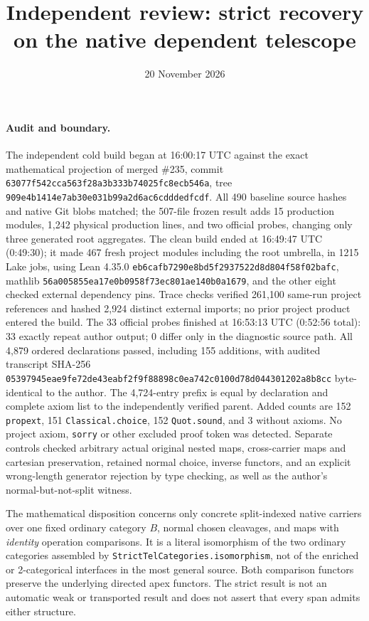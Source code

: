 \documentclass[11pt]{article}
\title{Independent review: strict recovery on the native dependent telescope}
\author{}
\date{20 November 2026}
\newcommand{\code}[1]{\texttt{#1}}
\begin{document}
\maketitle

\paragraph{Audit and boundary.}
The independent cold build began at 16:00:17 UTC against the exact mathematical projection of merged \#235, commit \code{63077f542cca563f28a3b333b74025fc8ecb546a}, tree \code{909e4b1414e7ab30e031b99a2d6ac6cdddedfcdf}. All 490 baseline source hashes and native Git blobs matched; the 507-file frozen result adds 15 production modules, 1,242 physical production lines, and two official probes, changing only three generated root aggregates. The clean build ended at 16:49:47 UTC (0:49:30); it made 467 fresh project modules including the root umbrella, in 1215 Lake jobs, using Lean 4.35.0 \code{eb6cafb7290e8bd5f2937522d8d804f58f02bafc}, mathlib \code{56a005855ea17e0b0958f73ec801ae140b0a1679}, and the other eight checked external dependency pins. Trace checks verified 261,100 same-run project references and hashed 2,924 distinct external imports; no prior project product entered the build. The 33 official probes finished at 16:53:13 UTC (0:52:56 total): 33 exactly repeat author output; 0 differ only in the diagnostic source path. All 4,879 ordered declarations passed, including 155 additions, with audited transcript SHA-256 \code{05397945eae9fe72de43eabf2f9f88898c0ea742c0100d78d044301202a8b8cc} byte-identical to the author. The 4,724-entry prefix is equal by declaration and complete axiom list to the independently verified parent. Added counts are 152 \code{propext}, 151 \code{Classical.choice}, 152 \code{Quot.sound}, and 3 without axioms. No project axiom, \texttt{sorry} or other excluded proof token was detected. Separate controls checked arbitrary actual original nested maps, cross-carrier maps and cartesian preservation, retained normal choice, inverse functors, and an explicit wrong-length generator rejection by type checking, as well as the author's normal-but-not-split witness.

The mathematical disposition concerns only concrete split-indexed native carriers over one fixed ordinary category \(B\), normal chosen cleavages, and maps with \emph{identity} operation comparisons. It is a literal isomorphism of the two ordinary categories assembled by \code{StrictTelCategories.isomorphism}, not of the enriched or 2-categorical interfaces in the most general source. Both comparison functors preserve the underlying directed apex functors. The strict result is not an automatic weak or transported result and does not assert that every span admits either structure.
\end{document}
